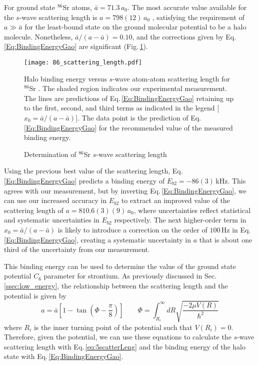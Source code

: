 For ground state $^{86}$Sr atoms, $\bar{a}=71.3$\,$a_0$.
The most accurate value available for the $s$-wave scattering length is $a=798 (12)$\,$a_0$ \cite{Stein2010}, satisfying the requirement of $a\gg \bar{a}$ for the least-bound state on the ground molecular potential to be a halo molecule.
Nonetheless, ${\bar{a}}/({a-\bar{a}})=0.10$, and the corrections given by Eq.\,\ref{Eq:BindingEnergyGao} are significant (Fig.\,\ref{fig:HaloBindingEnergy}).
	\begin{figure} 
	\centerline{
	  \texttt{[image: 86\_scattering\_length.pdf]}}
	  \caption{Determination of $^{86}$Sr $s$-wave scattering length}{Halo binding energy versus $s$-wave atom-atom scattering length for $^{86}$Sr . The shaded region indicates our experimental measurement. The lines are predictions of Eq.\,\ref{Eq:BindingEnergyGao} retaining up to the first, second, and third terms as indicated in the legend [$x_0={\bar{a}}/({a-\bar{a}})$]. The data point is the prediction of Eq.\,\ref{Eq:BindingEnergyGao} for the recommended value of the measured binding energy.}
	  \label{fig:HaloBindingEnergy}
	\end{figure}
Using the previous best value of the scattering length, Eq.\,\ref{Eq:BindingEnergyGao} predicts a binding energy of $E_{b2}=-86(3)$\,kHz.
This agrees with our measurement, but by inverting Eq.\,\ref{Eq:BindingEnergyGao}, we can use our increased accuracy in $E_{b2}$ to extract an improved value of the scattering length of $a=810.6(3)(9)$\,$a_0$, where uncertainties reflect statistical and systematic uncertainties in $E_{b2}$ respectively.
The next higher-order term in $x_0={\bar{a}}/({a-\bar{a}})$ is likely to introduce a correction on the order of $100$\,Hz in Eq.\,\ref{Eq:BindingEnergyGao}, creating a systematic uncertainty in $a$ that is about one third of the uncertainty from our measurement.

This binding energy can be used to determine the value of the ground state potential $C_6$ parameter for strontium.
As previously discussed in Sec.\,\ref{ssec:low_energy}, the relationship between the scattering length and the potential is given by
\begin{equation} \label{eq:5scatterLeng}
	a = \bar{a} \left[ 1 - \tan(\Phi - \frac{\pi}{8}) \right] \quad \quad \Phi = \int_{R_i}^{\infty} dR \sqrt{\frac{-2\mu V(R)}{\hbar^2}}
\end{equation} 
where $R_i$ is the inner turning point of the potential such that $V(R_i)=0$.
Therefore, given the potential, we can use these equations to calculate the $s$-wave scattering length with Eq.\,\ref{eq:5scatterLeng} and the binding energy of the halo state with Eq.\,\ref{Eq:BindingEnergyGao}.

